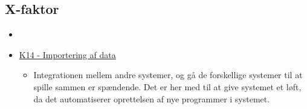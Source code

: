 \subsection{X-faktor}
\begin{itemize}
    \item {}
    \item \hyperref[table:funktionskrav]{K14 - Importering af data} 
    \begin{itemize}
        \item Integrationen mellem andre systemer, og gå de forskellige systemer til at spille sammen er spændende. Det er her med til at give systemet et løft, da det automatiserer oprettelsen af nye programmer i systemet.
    \end{itemize}{}
\end{itemize}

